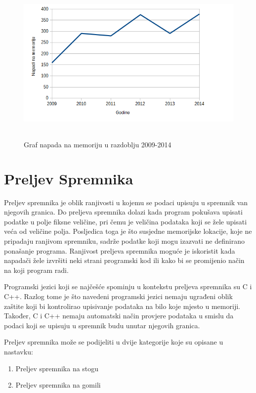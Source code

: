 \documentclass[times, utf8, diplomski, numeric]{fer}
\begin{document}
\pagebreak
\begin{figure}[!ht]
\centering
\setlength\fboxsep{0pt}
\setlength\fboxrule{0.5pt}
\includegraphics[width=12cm, height=8cm]{slike/memory_corruption}
\caption{Graf napada na memoriju u razdoblju 2009-2014}
\label{fig:mem_corruption} 
\end{figure} 

\section{Preljev Spremnika}
\label{sct:bufferOverflow}

Preljev spremnika je oblik ranjivosti u kojemu se podaci upisuju
u spremnik van njegovih granica. Do preljeva spremnika dolazi
kada program pokušava upisati podatke u polje fiksne veličine,
pri čemu je veličina podataka koji se žele upisati veća od
veličine polja. Posljedica toga je što susjedne memorijske
lokacije, koje ne pripadaju ranjivom spremniku, sadrže podatke
koji mogu izazvati ne definirano ponašanje programa. Ranjivost
preljeva spremnika moguće je iskoristit kada napadači žele
izvršiti neki strani programski kod ili kako bi se promijenio
način na koji program radi. 

Programski jezici koji se najčešće spominju u kontekstu preljeva
spremnika su C i C++. Razlog tome je što navedeni programski
jezici nemaju ugrađeni oblik zaštite koji bi kontrolirao
upisivanje podataka na bilo koje mjesto u memoriji. Također, C i
C++ nemaju automatski način provjere podataka u smislu da podaci
koji se upisuju u spremnik budu unutar njegovih granica.

Preljev spremnika može se podijeliti u dvije kategorije koje su
opisane u nastavku:

\begin{enumerate}
\item Preljev spremnika na stogu
\item Preljev spremnika na gomili
\end{enumerate}
\end{document}
